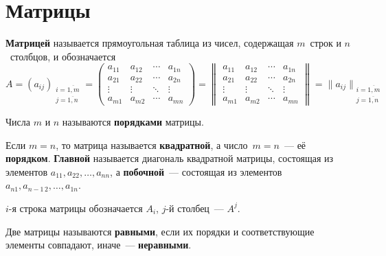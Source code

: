 \section{Матрицы}
 \textbf{Матрицей} называется прямоугольная таблица из чисел, содержащая $m$~строк и $n$~столбцов, и обозначается
\begin{equation*}
A = (a_{ij})_{\begin{smallmatrix}
i = \overline{1, m} \\
j = \overline{1, n}
\end{smallmatrix}} =
\begin{pmatrix}
a_{11} & a_{12} & \cdots & a_{1n} \\
a_{21} & a_{22} & \cdots & a_{2n} \\
\vdots & \vdots & \ddots & \vdots \\
a_{m1} & a_{m2} & \cdots & a_{mn}
\end{pmatrix} =
\begin{Vmatrix}
a_{11} & a_{12} & \cdots & a_{1n} \\
a_{21} & a_{22} & \cdots & a_{2n} \\
\vdots & \vdots & \ddots & \vdots \\
a_{m1} & a_{m2} & \cdots & a_{mn}
\end{Vmatrix} =
\|a_{ij}\|_{\begin{smallmatrix}
i = \overline{1, m} \\
j = \overline{1, n}
\end{smallmatrix}}
\end{equation*}

Числа $m$ и $n$ называются \textbf{порядками} матрицы.

Если $m = n$, то матрица называется \textbf{квадратной}, а число~$m = n$~--- её \textbf{порядком}.
\textbf{Главной} называется диагональ квадратной матрицы, состоящая из элементов $a_{11}, a_{22}, \ldots, a_{nn}$, а \textbf{побочной}~--- состоящая из элементов $a_{n1}, a_{n-1\, 2}, \ldots, a_{1n}$.

$i$-я строка матрицы обозначается $A_i$, $j$-й столбец~--- $A^j$.

Две матрицы называются \textbf{равными}, если их порядки и соответствующие элементы совпадают, иначе~--- \textbf{неравными}.